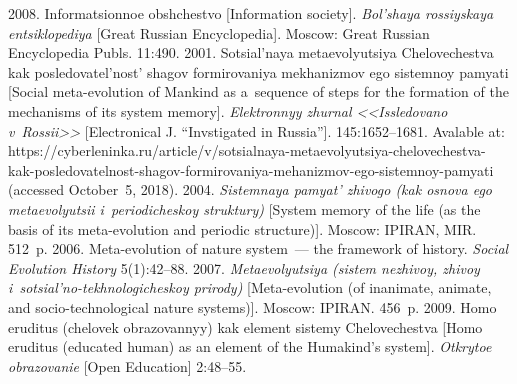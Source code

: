   







  \begin{multicols}{2}

\renewcommand{\bibname}{\protect\rmfamily References}

{\small\frenchspacing
 {%
 \begin{thebibliography}{99}

 2008. Informatsionnoe ob\-shche\-st\-vo [Information 
society]. \textit{Bol'shaya rossiyskaya entsiklopediya} [Great Russian 
Encyclopedia].  Moscow: Great Russian 
Encyclopedia Publs. 11:490.
 2001. Sotsial'naya me\-ta\-evo\-lyu\-tsiya Chelovechestva kak 
posledovatel'nost' shagov for\-mi\-ro\-va\-niya mekhanizmov ego sistemnoy pamyati 
[Social meta-evolution of Mankind as a~sequence of steps for the formation of the 
mechanisms of its system memory]. \textit{Elektronnyy zhurnal <<Issledovano 
v~Rossii>>} [Electronical J. ``Invstigated in Russia'']. 145:1652--1681. Avalable 
at: {\sf  
https://cyberleninka.ru/article/v/sotsialnaya-metaevolyutsiya-chelovechestva-kak-posledovatelnost-shagov-formirovaniya-mehanizmov-ego-sistemnoy-pamyati} (accessed 
October~5, 2018).
 2004. \textit{Sistemnaya pamyat' zhivogo (kak osnova 
ego metaevolyutsii i~periodicheskoy struktury)} [System memory of the life (as the 
basis of its meta-evolution and periodic structure)]. Moscow: IPIRAN, MIR. 
512~p.
 2006. Meta-evolution of nature system~--- the 
framework of history. \textit{Social Evolution History} 5(1):42--88.
 2007. \textit{Metaevolyutsiya (sistem nezhivoy, zhivoy 
i~sotsial'no-tekhnologicheskoy prirody)} [Meta-evolution (of inanimate, animate, 
and socio-technological nature systems)]. Moscow: IPIRAN. 456~p. 
 2009. Homo eruditus (chelovek obrazovannyy) kak 
element sistemy Chelovechestva [Homo eruditus (educated human) as an element 
of the Humakind's system]. \textit{Otkrytoe obrazovanie} [Open Education]  
2:48--55.


\end{thebibliography}}}
\end{multicols}
